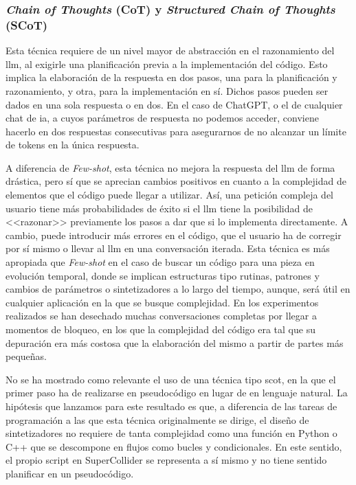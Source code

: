 \subsubsection{\textit{Chain of Thoughts} (CoT) y \textit{Structured Chain of Thoughts} (SCoT)}

Esta técnica requiere de un nivel mayor de abstracción en el razonamiento del \gls{llm}, al exigirle una planificación previa a la implementación del código. Esto implica la elaboración de la respuesta en dos pasos, una para la planificación y razonamiento, y otra, para la implementación en sí. Dichos pasos pueden ser dados en una sola respuesta o en dos. En el caso de ChatGPT, o el de cualquier chat de \gls{ia}, a cuyos parámetros de respuesta no podemos acceder, conviene hacerlo en dos respuestas consecutivas para asegurarnos de no alcanzar un límite de tokens en la única respuesta. 

A diferencia de \textit{Few-shot}, esta técnica no mejora la respuesta del \gls{llm} de forma drástica, pero sí que se aprecian cambios positivos en cuanto a la complejidad de elementos que el código puede llegar a utilizar. Así, una petición compleja del usuario tiene más probabilidades de éxito si el \gls{llm} tiene la posibilidad de <<razonar>> previamente los pasos a dar que si lo implementa directamente. A cambio, puede introducir más errores en el código, que el usuario ha de corregir por sí mismo o llevar al \gls{llm} en una conversación iterada. Esta técnica es más apropiada que \textit{Few-shot} en el caso de buscar un código para una pieza en evolución temporal, donde se implican estructuras tipo rutinas, patrones y cambios de parámetros o sintetizadores a lo largo del tiempo, aunque, será útil en cualquier aplicación en la que se busque complejidad. En los experimentos realizados se han desechado muchas conversaciones completas por llegar a momentos de bloqueo, en los que la complejidad del código era tal que su depuración era más costosa que la elaboración del mismo a partir de partes más pequeñas.

No se ha mostrado como relevante el uso de una técnica tipo \gls{scot}, en la que el primer paso ha de realizarse en pseudocódigo en lugar de en lenguaje natural. La hipótesis que lanzamos para este resultado es que, a diferencia de las tareas de programación a las que esta técnica originalmente se dirige, el diseño de sintetizadores no requiere de tanta complejidad como una función en Python o C++ que se descompone en flujos como bucles y condicionales. En este sentido, el propio script en SuperCollider se representa a sí mismo y no tiene sentido planificar en un pseudocódigo.

